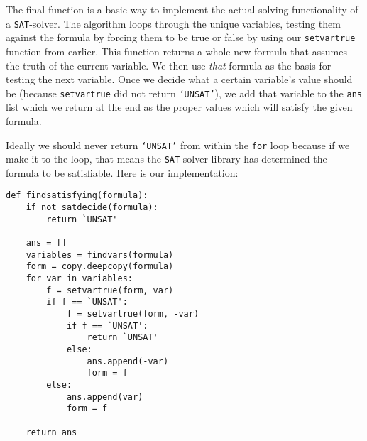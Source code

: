 \documentclass[11pt, letterpaper]{article}
\begin{document}
The final function is a basic way to implement the actual solving functionality
of a \texttt{SAT}-solver. The algorithm loops through the unique variables,
testing them against the formula by forcing them to be true or false by using
our \texttt{setvartrue} function from earlier. This function returns a whole new
formula that assumes the truth of the current variable. We then use
\textit{that} formula as the basis for testing the next variable. Once we decide
what a certain variable's value should be (because \texttt{setvartrue} did not
return \texttt{`UNSAT'}), we add that variable to the \texttt{ans} list which we
return at the end as the proper values which will satisfy the given formula.

Ideally we should never return \texttt{`UNSAT'} from within the \texttt{for}
loop because if we make it to the loop, that means the \texttt{SAT}-solver
library has determined the formula to be satisfiable. Here is our
implementation:

\begin{verbatim}
def findsatisfying(formula):
    if not satdecide(formula):
        return `UNSAT'

    ans = []
    variables = findvars(formula)
    form = copy.deepcopy(formula)
    for var in variables:
        f = setvartrue(form, var)
        if f == `UNSAT':
            f = setvartrue(form, -var)
            if f == `UNSAT':
                return `UNSAT'
            else:
                ans.append(-var)
                form = f
        else:
            ans.append(var)
            form = f

    return ans
\end{verbatim}
\end{document}
